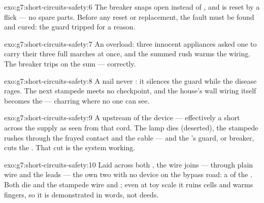 \begin{solution}{exo:g7:short-circuits-safety:6}
The breaker snaps open instead of , and is reset by a
flick --- no spare parts. Before any reset or replacement, the
fault must be found and cured: the guard tripped for a reason.
\end{solution}

\begin{solution}{exo:g7:short-circuits-safety:7}
An overload: three innocent appliances asked one  to carry
their three full marches at once, and the summed rush warms the
wiring. The breaker trips on the sum --- correctly.
\end{solution}

\begin{solution}{exo:g7:short-circuits-safety:8}
A nail never : it silences the guard while the disease
rages. The next stampede meets no checkpoint, and the house's
wall wiring itself becomes the  --- charring where no one
can see.
\end{solution}

\begin{solution}{exo:g7:short-circuits-safety:9}
A  upstream of the device --- effectively a short
across the supply as seen from that cord. The lamp dies
(deserted), the stampede rushes through the frayed contact and
 the cable --- and the 's guard,  or breaker,
cuts the . That cut is the system working.
\end{solution}

\begin{solution}{exo:g7:short-circuits-safety:10}
Laid across both , the wire joins --- through plain wire
and the  leads --- the  own two  with
no device on the bypass road: a  of the .
Both  die and the stampede  wire and ; even at
toy scale it ruins cells and warms fingers, so it is
demonstrated in words, not deeds.
\end{solution}

